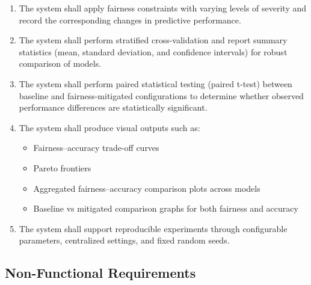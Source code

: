 \begin{enumerate}
    \item[FR5.] The system shall apply fairness constraints with varying levels of severity and record the corresponding changes in predictive performance.

    \item[FR6.] The system shall perform stratified cross-validation and report summary statistics (mean, standard deviation, and confidence intervals) for robust comparison of models.

    \item[FR7.] The system shall perform paired statistical testing (paired t-test) between baseline and fairness-mitigated configurations to determine whether observed performance differences are statistically significant.

    \item[FR8.] The system shall produce visual outputs such as:
    \begin{itemize}
        \item Fairness--accuracy trade-off curves
        \item Pareto frontiers
        \item Aggregated fairness--accuracy comparison plots across models
        \item Baseline vs mitigated comparison graphs for both fairness and accuracy
    \end{itemize}

    \item[FR9.] The system shall support reproducible experiments through configurable parameters, centralized settings, and fixed random seeds.
\end{enumerate}

\subsection{Non-Functional Requirements}

